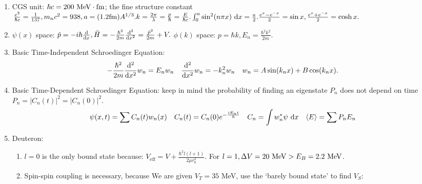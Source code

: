 \documentclass{school-22.101-notes}
\begin{document}
\begin{enumerate}
\item CGS unit: $\hbar c = 200 \mbox{ } \mathrm{MeV} \cdot \mathrm{fm}$; the fine structure constant $\frac{e^2}{\hbar c} = \frac{1}{137}, m_n c^2 = 938, a=(1.2 \mathrm{fm}) A^{1/3}. k = \frac{2\pi}{\lambda} = \frac{p}{\hbar} = \frac{E}{\hbar c}. \int_0^a \sin^2 (n \pi x) \mbox{ }\mathrm{d} x = \frac{a}{2}. \frac{e^x - e^{-x} }{2} = \sin x, \frac{e^x + e^{-x}}{2} = \cosh x.$
\item $\psi(x)$ space: $\hat{p} = - i \hbar \frac{\mathrm{d}}{\mathrm{d}x}, \hat{H} = - \frac{\hbar^2}{2m} \frac{\mathrm{d}^{2}}{\mathrm{d}x^{2}} = \frac{\hat{p}^2}{2m} + V.$ $\phi(k)$ space: $p = \hbar k, E_n = \frac{\hbar^2 k^2}{2m}$. 
\item Basic Time-Independent Schroedinger Equation:
\begin{align}
- \frac{\hbar^2}{2m} \frac{\mathrm{d}^{2}}{\mathrm{d}x^{2}} w_n &= E_n w_n & \frac{\mathrm{d}^{2}}{\mathrm{d}x^{2}} w_n &= - k_n^2 w_n & w_n &= A \sin (k_n x) + B \cos (k_n x).
\end{align}
\item Basic Time-Dependent Schroedinger Equation: keep in mind the probability of finding an eigenstate $P_n$ does not depend on time $P_n = |C_n (t)|^2 = |C_n (0)|^2$. 
\begin{align}
\psi(x,t) &= \displaystyle\sum C_n (t) w_n (x) & C_n (t) &= C_n (0) e^{-\frac{i E_n t}{\hbar}}  & C_n &= \int w_n^* \psi \mbox{ }\mathrm{d} x  & \left< E \right> &= \displaystyle\sum P_n E_n 
\end{align}
\item Deuteron:
    \begin{enumerate}
    \item $l=0$ is the only bound state because: $V_{\mathrm{eff}} = V + \frac{\hbar^2 l(l+1)}{2 \mu r_0^2}$. 
    For $l=1, \Delta V = 20 \mbox{ } \mathrm{MeV} > E_B = 2.2 \mbox{ } \mathrm{MeV}$.
    \item Spin-spin coupling is necessary, because 
    We are given $V_T = 35$ MeV, use the `barely bound state' to find $V_S$: 

\end{enumerate}
\end{enumerate}
\end{document}
